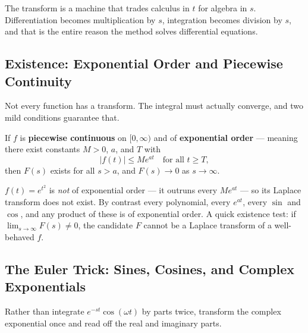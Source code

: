 \begin{conceptbox}
The transform is a machine that trades \textcolor{accentorange}{calculus in $t$}
for \textcolor{accentorange}{algebra in $s$}. Differentiation becomes multiplication
by $s$, integration becomes division by $s$, and that is the entire reason the method
solves differential equations.
\end{conceptbox}

\subsection{Existence: Exponential Order and Piecewise Continuity}

Not every function has a transform. The integral must actually converge, and two
mild conditions guarantee that.

\begin{formulabox}
If $f$ is \textbf{piecewise continuous} on $[0,\infty)$ and of \textbf{exponential
order} --- meaning there exist constants $M>0$, $a$, and $T$ with
\[ |f(t)| \le M e^{at} \quad \text{for all } t \ge T, \]
then $F(s)$ exists for all $s > a$, and $F(s)\to 0$ as $s\to\infty$.
\end{formulabox}

\begin{warningbox}
$f(t)=e^{t^2}$ is \emph{not} of exponential order --- it outruns every $Me^{at}$ ---
so its Laplace transform does not exist. By contrast every polynomial, every
$e^{at}$, every $\sin$ and $\cos$, and any product of these is of exponential order.
A quick existence test: if $\lim_{s\to\infty}F(s)\ne 0$, the candidate $F$ cannot be
a Laplace transform of a well-behaved $f$.
\end{warningbox}

\subsection{The Euler Trick: Sines, Cosines, and Complex Exponentials}

Rather than integrate $e^{-st}\cos(\omega t)$ by parts twice, transform the complex
exponential once and read off the real and imaginary parts.

